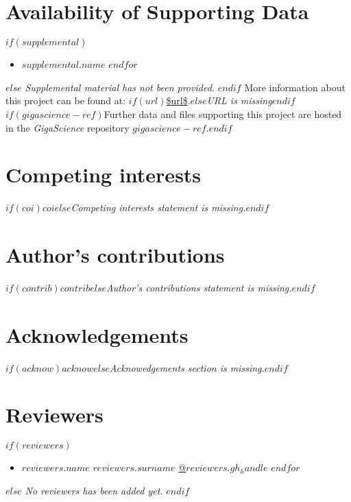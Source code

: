 \documentclass[10pt,a4paper,onecolumn]{bmcart}%
\begin{document}
\begin{backmatter}

\section*{Availability of Supporting Data}
$if(supplemental)$
\begin{itemize}
\setlength\itemsep{0em}
$for(supplemental)$
\item \href{$supplemental.url$}{$supplemental.name$}
$endfor$
\end{itemize}
$else$
\emph{Supplemental material has not been provided.}
$endif$
More information about this project can be found at: $if(url)$\url{$url$}.$else$\emph{URL is missing}$endif$ $if(gigascience-ref)$Further data and files supporting this project are hosted in the \emph{GigaScience} repository $gigascience-ref$.$endif$

\section*{Competing interests}
$if(coi)$$coi$$else$\emph{Competing interests statement is missing.}$endif$

\section*{Author's contributions}
$if(contrib)$$contrib$$else$\emph{Author's contributions statement is missing.}$endif$

\section*{Acknowledgements}
$if(acknow)$$acknow$$else$\emph{Acknowedgements section is missing.}$endif$

\section*{Reviewers}
$if(reviewers)$
\begin{itemize}
\setlength\itemsep{0em}
$for(reviewers)$
\item $reviewers.name$ $reviewers.surname$ \href{https://github.com/$reviewers.gh_handle$}{@$reviewers.gh_handle$}
$endfor$
\end{itemize}
$else$
\emph{No reviewers has been added yet.}
$endif$

  
  

\end{backmatter}
\end{document}
